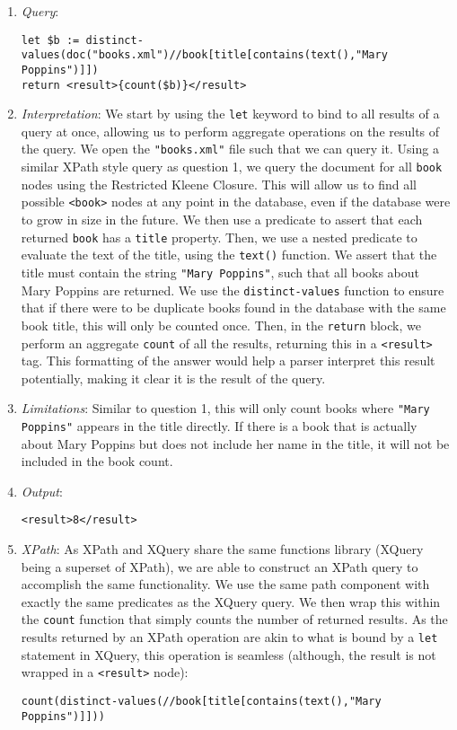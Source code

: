 \documentclass[11pt]{article}
\begin{document}
\begin{enumerate}
\item \textit{Query}:
\begin{small}
\begin{verbatim}
let $b := distinct-values(doc("books.xml")//book[title[contains(text(),"Mary Poppins")]])
return <result>{count($b)}</result>
\end{verbatim}
\end{small}

\item \textit{Interpretation}: We start by using the \texttt{let} keyword to bind to all results of a query at once, allowing us to perform aggregate operations on the results of the query. We open the \texttt{"books.xml"} file such that we can query it. Using a similar XPath style query as question 1, we query the document for all \texttt{book} nodes using the Restricted Kleene Closure. This will allow us to find all possible \texttt{<book>} nodes at any point in the database, even if the database were to grow in size in the future. We then use a predicate to assert that each returned \texttt{book} has a \texttt{title} property. Then, we use a nested predicate to evaluate the text of the title, using the \texttt{text()} function. We assert that the title must contain the string \texttt{"Mary Poppins"}, such that all books about Mary Poppins are returned. We use the \texttt{distinct-values} function to ensure that if there were to be duplicate books found in the database with the same book title, this will only be counted once. Then, in the \texttt{return} block, we perform an aggregate \texttt{count} of all the results, returning this in a \texttt{<result>} tag. This formatting of the answer would help a parser interpret this result potentially, making it clear it is the result of the query.

\item \textit{Limitations}: Similar to question 1, this will only count books where \texttt{"Mary Poppins"} appears in the title directly. If there is a book that is actually about Mary Poppins but does not include her name in the title, it will not be included in the book count.

\item \textit{Output}:
\begin{verbatim}
<result>8</result>
\end{verbatim} 

\item \textit{XPath}: As XPath and XQuery share the same functions library (XQuery being a superset of XPath), we are able to construct an XPath query to accomplish the same functionality. We use the same path component with exactly the same predicates as the XQuery query. We then wrap this within the \texttt{count} function that simply counts the number of returned results. As the results returned by an XPath operation are akin to what is bound by a \texttt{let} statement in XQuery, this operation is seamless (although, the result is not wrapped in a \texttt{<result>} node):
\begin{verbatim}
count(distinct-values(//book[title[contains(text(),"Mary Poppins")]]))
\end{verbatim}


\end{enumerate}
\end{document}
